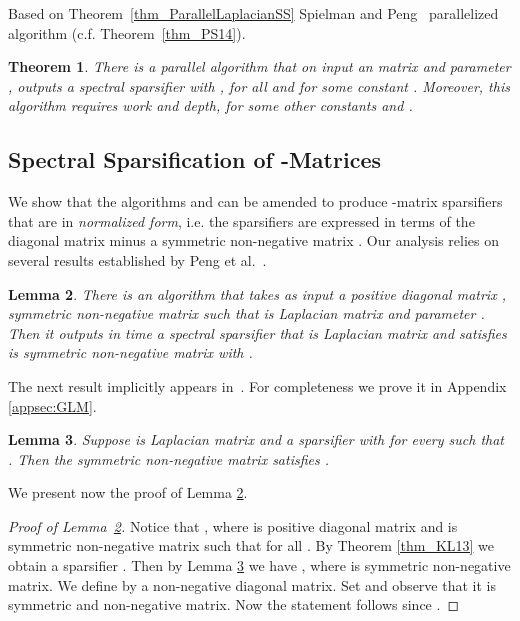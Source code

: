 \documentclass[11pt]{article}
\newtheorem{thm}{Theorem}  \newtheorem{fact}[thm]{Fact}
\newtheorem{lem}[thm]{Lemma}
\numberwithin{thm}{section}
\begin{document}
Based on Theorem~\ref{thm_ParallelLaplacianSS} Spielman and Peng~\cite{PS14} parallelized algorithm  (c.f. Theorem~\ref{thm_PS14}).

\begin{thm}\label{thm_pPS14}\cite{PS14}
There is a parallel algorithm that on input an  matrix  and parameter , outputs a spectral sparsifier  with ,  for all  and  for some constant . Moreover, this algorithm requires  work and  depth, for some other constants  and .
\end{thm}


\subsection{Spectral Sparsification of -Matrices}\label{subsec:SSGL}

We show that the algorithms  and  can be amended to produce -matrix sparsifiers that are in \emph{normalized form}, i.e. the sparsifiers are expressed in terms of the diagonal matrix  minus a symmetric non-negative matrix . Our analysis relies on several results established by Peng et al.~\cite{PengPhd13,PS14,CCLPT14,CCLPT15}.

\begin{lem}\label{lemSSDA}
There is an algorithm  that takes as input a positive diagonal matrix , symmetric non-negative matrix   such that  is Laplacian matrix and parameter . Then it outputs in 
time a spectral sparsifier  that is Laplacian matrix and satisfies  is symmetric non-negative matrix with .
\end{lem}

The next result implicitly appears in~\cite{CCLPT15}. For completeness we prove it in Appendix \ref{appsec:GLM}.

\begin{lem}\label{lem_my_DappToD}
Suppose  is Laplacian matrix  and  a sparsifier with  for every  such that .
Then the symmetric non-negative matrix 
satisfies .
\end{lem}

We present now the proof of Lemma \ref{lemSSDA}.

\begin{proof}[Proof of Lemma~\ref{lemSSDA}] Notice that , where  is positive diagonal matrix and  is symmetric non-negative matrix such that  for all .
By Theorem \ref{thm_KL13} we obtain a sparsifier . Then by Lemma \ref{lem_my_DappToD} we have  , where  is symmetric non-negative matrix. We define by  a non-negative diagonal matrix. Set  and observe that it is symmetric and non-negative matrix. Now the statement follows since .
\end{proof}
\end{document}
